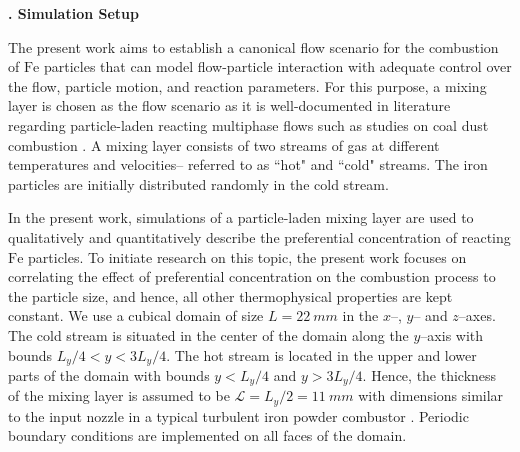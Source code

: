 \documentclass[twocolumn,10pt,dvipsnames]{article} %
\newcommand{\mrm}[1]{\mathrm{#1}}
\renewcommand{\section}%
              [1]%
              {%
               \bgroup%
               \flushleft%
               \small\bf%
               \refstepcounter{section}%
               \arabic{section}. #1%
               \par%
               \egroup%
              }%
\renewcommand{\subsection}%
              [1]%
              {%
               \bgroup%
               \flushleft%
               \small\em%
               \refstepcounter{subsection}%
               \arabic{section}.%
               \arabic{subsection}. #1%
               \par%
               \egroup%
              }%
\begin{document}

\section{Simulation Setup}\label{sec:simsetup}\addvspace{10pt}

The present work aims to establish a canonical flow scenario for the combustion of $\mrm{Fe}$ particles that can model flow-particle interaction with adequate control over the flow, particle motion, and reaction parameters. For this purpose, a mixing layer is chosen as the flow scenario as it is well-documented in literature regarding particle-laden reacting multiphase flows such as studies on coal dust combustion \cite{rieth2018carrier}. A mixing layer consists of two streams of gas at different temperatures and velocities-- referred to as ``hot" and ``cold" streams. The iron particles are initially distributed randomly in the cold stream.

In the present work, simulations of a particle-laden mixing layer are used to qualitatively and quantitatively describe the preferential concentration of reacting $\mrm{Fe}$ particles. To initiate research on this topic, the present work focuses on correlating the effect of preferential concentration on the combustion process to the particle size, and hence, all other thermophysical properties are kept constant. We use a cubical domain of size $L = \SI{22}{mm}$ in the $x$--, $y$-- and $z$--axes. The cold stream is situated in the center of the domain along the $y$--axis with bounds $L_y/4 < y < 3L_y/4$. The hot stream is located in the upper and lower parts of the domain with bounds $y<L_y/4$ and $y>3L_y/4$. Hence, the thickness of the mixing layer is assumed to be $\mathcal{L}= L_y/2 = \SI{11}{mm}$ with dimensions similar to the input nozzle in a typical turbulent iron powder combustor \cite{baigmohammadi2023towards}. Periodic boundary conditions are implemented on all faces of the domain. 
\end{document}
